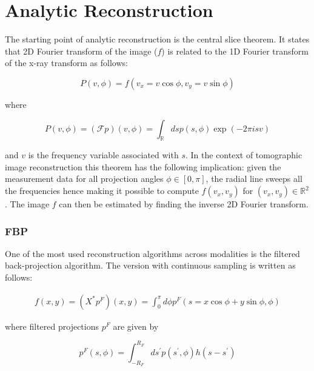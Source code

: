 \section{Analytic Reconstruction}

The starting point of analytic reconstruction is the central slice theorem. It states that 2D Fourier transform of the image ($f$) is related to the 1D Fourier transform of the x-ray transform as follows:

\begin{equation}
P(v, \phi)=f\left(v_{x}=v \cos \phi, v_{y}=v \sin \phi\right)
\end{equation} 

where

\begin{equation}
P(v, \phi)=(\mathcal{F} p)(v, \phi)=\int_{\mathbb{R}} d s p(s, \phi) \exp (-2 \pi i s v)
\end{equation}

and $v$ is the frequency variable associated with $s$. In the context of tomographic image reconstruction this theorem has the following implication: given the measurement data for all projection angles $\phi \in [0,\pi]$, the radial line sweeps all the frequencies hence making it possible to compute $f(v_{x},v_{y})$ for $(v_{x},v_{y})\in \mathbb{R}^2$. The image $f$ can then be estimated by finding the inverse 2D Fourier transform. 

\subsubsection{\ac{FBP}}

One of the most used reconstruction algorithms across modalities is the filtered back-projection algorithm. The version with continuous sampling is written as follows:


\begin{equation}
\begin{array}{l}
f(x, y)=\left(X^{*} p^{F}\right)(x, y)= 
\int_{0}^{\pi} d \phi p^{F}(s=x \cos \phi+y \sin \phi, \phi)
\end{array}
\end{equation}


where filtered projections $p^{F}$ are given by

\begin{equation}
p^{F}(s, \phi)=\int_{-R_{F}}^{R_{F}} d s^{\prime} p\left(s^{\prime}, \phi\right) h\left(s-s^{\prime}\right)
\end{equation}


